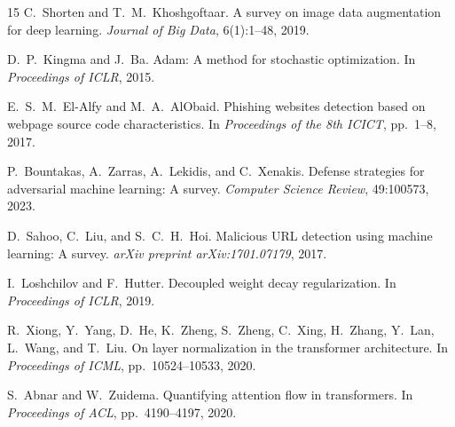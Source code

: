 \documentclass[sigconf, nonacm]{acmart}
\begin{document}
\begin{thebibliography}{15}
C.~Shorten and T.~M.~Khoshgoftaar.
\newblock A survey on image data augmentation for deep learning.
\newblock \emph{Journal of Big Data}, 6(1):1--48, 2019.

D.~P.~Kingma and J.~Ba.
\newblock Adam: A method for stochastic optimization.
\newblock In \emph{Proceedings of ICLR}, 2015.

E.~S.~M.~El-Alfy and M.~A.~AlObaid.
\newblock Phishing websites detection based on webpage source code
  characteristics.
\newblock In \emph{Proceedings of the 8th ICICT}, pp.~1--8, 2017.

P.~Bountakas, A.~Zarras, A.~Lekidis, and C.~Xenakis.
\newblock Defense strategies for adversarial machine learning:
  A survey.
\newblock \emph{Computer Science Review}, 49:100573, 2023.

D.~Sahoo, C.~Liu, and S.~C.~H.~Hoi.
\newblock Malicious {URL} detection using machine learning: A survey.
\newblock \emph{arXiv preprint arXiv:1701.07179}, 2017.

I.~Loshchilov and F.~Hutter.
\newblock Decoupled weight decay regularization.
\newblock In \emph{Proceedings of ICLR}, 2019.

R.~Xiong, Y.~Yang, D.~He, K.~Zheng, S.~Zheng, C.~Xing,
H.~Zhang, Y.~Lan, L.~Wang, and T.~Liu.
\newblock On layer normalization in the transformer architecture.
\newblock In \emph{Proceedings of ICML}, pp.~10524--10533, 2020.

S.~Abnar and W.~Zuidema.
\newblock Quantifying attention flow in transformers.
\newblock In \emph{Proceedings of ACL}, pp.~4190--4197, 2020.

\end{thebibliography}
\end{document}
